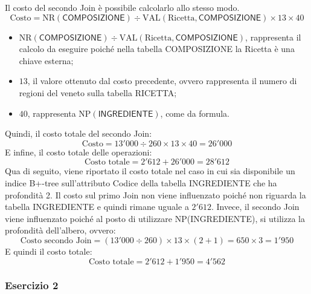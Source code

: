 \documentclass[a4paper]{article}
\begin{document}
	\noindent
	Il costo del secondo Join è possibile calcolarlo allo stesso modo. 
	\begin{equation*}
		\text{Costo} = \mathrm{NR}\left(\textsf{COMPOSIZIONE}\right) \div \mathrm{VAL}\left(\text{Ricetta}, \textsf{COMPOSIZIONE}\right) \times 13 \times 40
	\end{equation*}
	\begin{itemize}
		\item $\mathrm{NR}\left(\textsf{COMPOSIZIONE}\right) \div \mathrm{VAL}\left(\text{Ricetta}, \textsf{COMPOSIZIONE}\right)$, rappresenta il calcolo da eseguire poiché nella tabella \textsf{COMPOSIZIONE} la Ricetta è una chiave esterna;
		
		\item $13$, il valore ottenuto dal costo precedente, ovvero rappresenta il numero di regioni del veneto sulla tabella \textsf{RICETTA};
		
		\item $40$, rappresenta $\mathrm{NP}\left(\textsf{INGREDIENTE}\right)$, come da formula.
	\end{itemize}
	Quindi, il costo totale del secondo Join:
	\begin{equation*}
		\text{Costo} = 13'000 \div 260 \times 13 \times 40 = 26'000
	\end{equation*}
	E infine, il costo totale delle operazioni:
	\begin{equation*}
		\text{Costo totale} = 2'612 + 26'000 = 28'612
	\end{equation*}
	Qua di seguito, viene riportato il costo totale nel caso in cui sia disponibile un indice B+-tree sull'attributo Codice della tabella \textsf{INGREDIENTE} che ha profondità 2. Il costo sul primo Join non viene influenzato poiché non riguarda la tabella \textsf{INGREDIENTE} e quindi rimane uguale a $2'612$. Invece, il secondo Join viene influenzato poiché al posto di utilizzare NP(\textsf{INGREDIENTE}), si utilizza la profondità dell'albero, ovvero:
	\begin{equation*}
		\text{Costo secondo Join} = \left(13'000 \div 260\right) \times 13 \times \left(2+1\right) = 650 \times 3 = 1'950
	\end{equation*}
	E quindi il costo totale:
	\begin{equation*}
		\text{Costo totale} = 2'612 + 1'950 = 4'562
	\end{equation*}\newpage
	
	\subsubsection{Esercizio 2}
	
\end{document}
